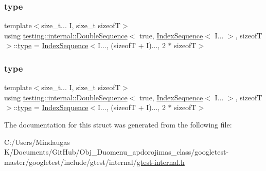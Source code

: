 \subsubsection{\texorpdfstring{type}{type}\hspace{0.1cm}{\footnotesize\ttfamily [1/2]}}
{\footnotesize\ttfamily template$<$size\+\_\+t... I, size\+\_\+t sizeofT$>$ \\
using \mbox{\hyperlink{structtesting_1_1internal_1_1_double_sequence}{testing\+::internal\+::\+Double\+Sequence}}$<$ true, \mbox{\hyperlink{structtesting_1_1internal_1_1_index_sequence}{Index\+Sequence}}$<$ I... $>$, sizeofT $>$\+::\mbox{\hyperlink{structtesting_1_1internal_1_1_double_sequence_3_01true_00_01_index_sequence_3_01_i_8_8_8_01_4_00_01sizeof_t_01_4_a6f0fbcc14f5264c7db52f3ba3e264545}{type}} =  \mbox{\hyperlink{structtesting_1_1internal_1_1_index_sequence}{Index\+Sequence}}$<$I..., (sizeofT + I)..., 2 $\ast$ sizeofT$>$}

\mbox{\label{structtesting_1_1internal_1_1_double_sequence_3_01true_00_01_index_sequence_3_01_i_8_8_8_01_4_00_01sizeof_t_01_4_a6f0fbcc14f5264c7db52f3ba3e264545}} 
\subsubsection{\texorpdfstring{type}{type}\hspace{0.1cm}{\footnotesize\ttfamily [2/2]}}
{\footnotesize\ttfamily template$<$size\+\_\+t... I, size\+\_\+t sizeofT$>$ \\
using \mbox{\hyperlink{structtesting_1_1internal_1_1_double_sequence}{testing\+::internal\+::\+Double\+Sequence}}$<$ true, \mbox{\hyperlink{structtesting_1_1internal_1_1_index_sequence}{Index\+Sequence}}$<$ I... $>$, sizeofT $>$\+::\mbox{\hyperlink{structtesting_1_1internal_1_1_double_sequence_3_01true_00_01_index_sequence_3_01_i_8_8_8_01_4_00_01sizeof_t_01_4_a6f0fbcc14f5264c7db52f3ba3e264545}{type}} =  \mbox{\hyperlink{structtesting_1_1internal_1_1_index_sequence}{Index\+Sequence}}$<$I..., (sizeofT + I)..., 2 $\ast$ sizeofT$>$}



The documentation for this struct was generated from the following file\+:\begin{DoxyCompactItemize}
\item 
C\+:/\+Users/\+Mindaugas K/\+Documents/\+Git\+Hub/\+Obj\+\_\+\+Duomenu\+\_\+apdorojimas\+\_\+class/googletest-\/master/googletest/include/gtest/internal/\mbox{\hyperlink{googletest-master_2googletest_2include_2gtest_2internal_2gtest-internal_8h}{gtest-\/internal.\+h}}\end{DoxyCompactItemize}
